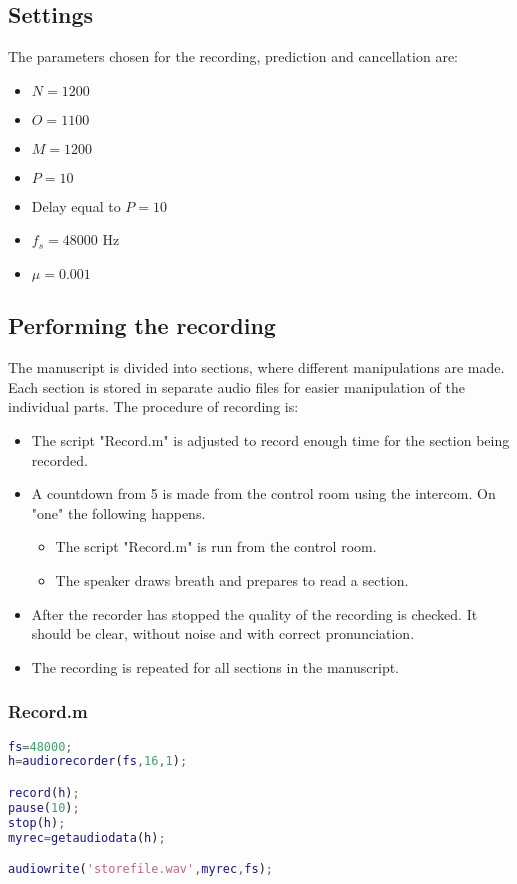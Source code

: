 \subsection{Settings}
The parameters chosen for the recording, prediction and cancellation are:
\begin{itemize}
	\item $N=1200$
	\item $O=1100$
	\item $M=1200$
	\item $P=10$
	\item Delay equal to $P=10$
	\item $f_s =48000$ Hz
	\item $\mu=0.001$
\end{itemize}

\subsection{Performing the recording}
The manuscript is divided into sections, where different manipulations are made. Each section is stored in separate audio files for easier manipulation of the individual parts. The procedure of recording is:
\begin{itemize}
	\item The script "Record.m" is adjusted to record enough time for the section being recorded. 
	\item A countdown from 5 is made from the control room using the intercom. On "one" the following happens.
	\begin{itemize}
		\item The script "Record.m" is run from the control room.
		\item The speaker draws breath and prepares to read a section.
	\end{itemize}
	\item After the recorder has stopped the quality of the recording is checked. It should be clear, without noise and with correct pronunciation.
	\item The recording is repeated for all sections in the manuscript.  
\end{itemize}

\subsubsection{Record.m}
\begin{lstlisting}[language=MATLAB,caption=Record.m.]
fs=48000;
h=audiorecorder(fs,16,1);

record(h);
pause(10);
stop(h);
myrec=getaudiodata(h);

audiowrite('storefile.wav',myrec,fs);
\end{lstlisting}

